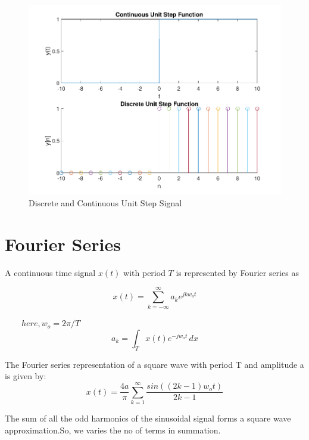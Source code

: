 \documentclass{article}
\begin{document}
\begin{figure}[H]
    \centering
    \includegraphics[scale=1.35,cframe=blue 0.5pt 3pt]{./FIG/unit}
    \caption{Discrete and Continuous Unit Step Signal}
\end{figure}



\section{Fourier Series}
A continuous time signal $x(t)$ with period $T$ is represented by Fourier series as

\begin{equation*}x(t)=\sum_{k = -\infty}^{\infty} a_ke^{jkw_ot}
\end{equation*}

$\quad \quad {here,w_o=2\pi/T} $\\
\begin{equation*}
    a_k=\int_{T}^{}x(t)e^{-jw_ot}  \,dx
\end{equation*}

The Fourier series representation of a square wave with period T and amplitude a is given by:
\begin{equation*}
    x(t)=\frac{4a}{\pi} \sum_{k = 1}^{\infty}\frac{sin((2k-1)w_ot)}{2k-1}
\end{equation*}

The sum of all the odd harmonics of the sinusoidal signal forms a square wave approximation.So, we varies the no of terms in summation.
\end{document}

